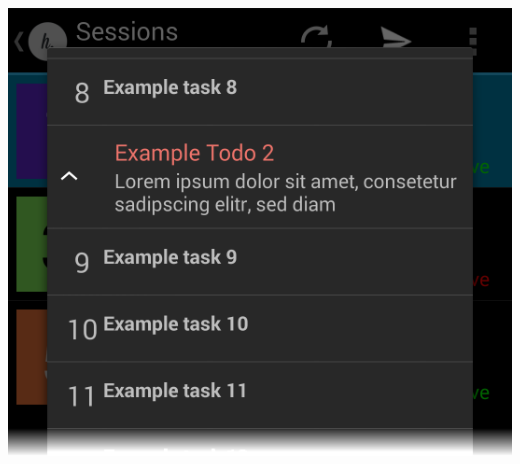 \begin{minipage}[t]{0.45\linewidth}
	\centering
	\includegraphics[width=\linewidth]{img/screen_todos_tasks}
	 \label{fig:screen_todos_tasks}
\end{minipage}


